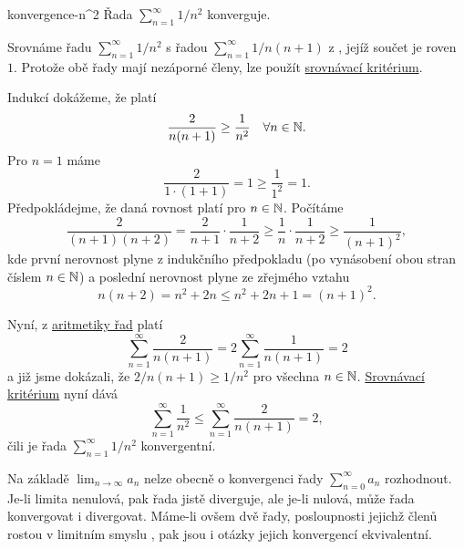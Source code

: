 \begin{lemma}{}{konvergence-n^2}
 Řada $\sum_{n=1}^{\infty} 1 / n^2$ konverguje.
\end{lemma}
\begin{lemproof}
 Srovnáme řadu $\sum_{n=1}^{\infty} 1 / n^2$ s řadou $\sum_{n=1}^{\infty} 1 /
 n(n+1)$ z , jejíž součet
 je roven $1$. Protože obě řady mají nezáporné členy, lze použít
 \hyperref[prop:srovnavaci-kriterium]{srovnávací kritérium}.

 Indukcí dokážeme, že platí
 \[
  \frac{2}{n(n+1)} \geq \frac{1}{n^2} \quad \forall n \in \mathbb{N}.
 \]
 Pro $n = 1$ máme
 \[
  \frac{2}{1 \cdot (1 + 1)} = 1 \geq \frac{1}{1^2} = 1.
 \]
 Předpokládejme, že daná rovnost platí pro $n \in \mathbb{N}$. Počítáme
 \[
  \frac{2}{(n+1)(n+2)} = \frac{2}{n+1} \cdot \frac{1}{n+2} \geq \frac{1}{n}
  \cdot \frac{1}{n+2} \geq \frac{1}{(n+1)^2},
 \]
 kde první nerovnost plyne z indukčního předpokladu (po vynásobení obou stran
 číslem $n \in \mathbb{N}$) a poslední nerovnost plyne ze zřejmého vztahu
 \[
  n(n+2) = n^2 + 2n \leq n^2 + 2n + 1 = (n+1)^2.
 \]

 Nyní, z \hyperref[prop:aritmetika-ciselnych-rad]{aritmetiky řad} platí
 \[
  \sum_{n=1}^{\infty} \frac{2}{n(n+1)} = 2 \sum_{n=1}^{\infty} \frac{1}{n(n+1)}
  = 2
 \]
 a již jsme dokázali, že $2 / n(n+1) \geq 1 / n^2$ pro všechna $n \in \mathbb{N}$.
 \hyperref[prop:srovnavaci-kriterium]{Srovnávací kritérium} nyní dává
 \[
  \sum_{n=1}^{\infty} \frac{1}{n^2} \leq \sum_{n=1}^{\infty} \frac{2}{n(n+1)} =
  2,
 \]
 čili je řada $\sum_{n=1}^{\infty} 1 / n^2$ konvergentní.
\end{lemproof}

Na základě $\lim_{n \to \infty} a_n$ nelze obecně o konvergenci řady
$\sum_{n=0}^{\infty} a_n$ rozhodnout. Je-li limita nenulová, pak řada jistě
diverguje, ale je-li nulová, může řada konvergovat i divergovat. Máme-li ovšem
dvě řady, posloupnosti jejichž členů rostou v limitním smyslu , pak jsou i otázky jejich konvergencí ekvivalentní.

